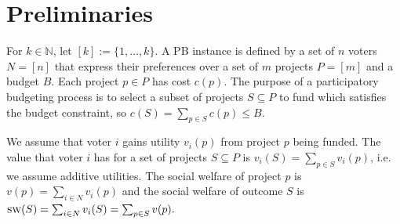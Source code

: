 \documentclass[letterpaper]{article} %
\newcommand{\sw}{\textsc{sw}}
\newcommand{\voters}{{N}}
\begin{document}

\section{Preliminaries}\label{sec:prem}

For   $k\in \mathbb{N}$,  let $[k] := \{1,\ldots,k\}$. A PB instance is defined by a set of $n$ voters $N=[n]$ that express their preferences over a set of $m$  projects $P=[m]$ and a budget $B$. 
Each project  $p\in P$ has cost   $c(p)$. 
The purpose  of  a participatory budgeting process  is to select  a subset of projects $S\subseteq P$  to fund which satisfies the budget constraint, so $c(S) =  \sum_{p\in S} c(p) \leq B$. 



We assume that voter $i$ gains utility $v_i(p)$ from project $p$ being funded. The value that  voter $i$ has for a set of projects $S\subseteq P$ is $v_i(S) = \sum_{p\in S} v_i(p)$, i.e. we assume additive utilities. 
The social welfare of project $p$ is $ v(p) = \sum_{i \in \voters} v_i(p)$ and the social welfare of outcome $S$ is $\sw(S) = \sum_{i\in \voters} v_i(S) = \sum_{p \in S} v(p).$ 
\end{document}
